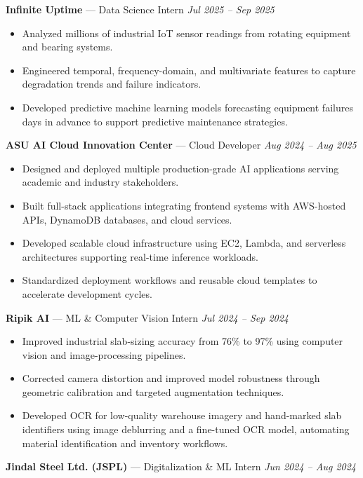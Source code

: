 \documentclass[a4paper,8pt]{extarticle}
\begin{document}
\noindent
\textbf{Infinite Uptime} --- Data Science Intern
\hfill \textit{Jul 2025 -- Sep 2025}

\begin{itemize}
\item Analyzed millions of industrial IoT sensor readings from rotating equipment and bearing systems.
\item Engineered temporal, frequency-domain, and multivariate features to capture degradation trends and failure indicators.
\item Developed predictive machine learning models forecasting equipment failures days in advance to support predictive maintenance strategies.
\end{itemize}

\noindent
\textbf{ASU AI Cloud Innovation Center} --- Cloud Developer
\hfill \textit{Aug 2024 -- Aug 2025}

\begin{itemize}
\item Designed and deployed multiple production-grade AI applications serving academic and industry stakeholders.
\item Built full-stack applications integrating frontend systems with AWS-hosted APIs, DynamoDB databases, and cloud services.
\item Developed scalable cloud infrastructure using EC2, Lambda, and serverless architectures supporting real-time inference workloads.
\item Standardized deployment workflows and reusable cloud templates to accelerate development cycles.
\end{itemize}

\noindent
\textbf{Ripik AI} --- ML \& Computer Vision Intern
\hfill \textit{Jul 2024 -- Sep 2024}

\begin{itemize}
\item Improved industrial slab-sizing accuracy from 76\% to 97\% using computer vision and image-processing pipelines.
\item Corrected camera distortion and improved model robustness through geometric calibration and targeted augmentation techniques.
\item Developed OCR for low-quality warehouse imagery and hand-marked slab identifiers using image deblurring and a fine-tuned OCR model, automating material identification and inventory workflows.
\end{itemize}

\noindent
\textbf{Jindal Steel Ltd. (JSPL)} --- Digitalization \& ML Intern
\hfill \textit{Jun 2024 -- Aug 2024}
\end{document}
